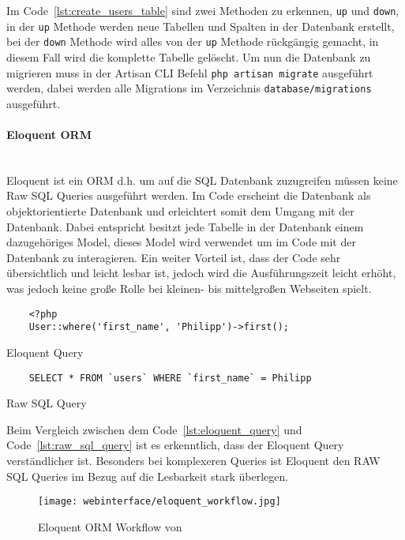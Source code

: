 Im Code~\ref{lst:create_users_table} sind zwei Methoden zu erkennen, \verb|up|
und \verb|down|, in der \verb|up| Methode werden neue Tabellen und Spalten in
der Datenbank erstellt, bei der \verb|down| Methode wird alles von der \verb|up|
Methode rückgängig gemacht, in diesem Fall wird die komplette Tabelle gelöscht.
Um nun die Datenbank zu migrieren muss in der Artisan \acs*{CLI} Befehl
\verb|php artisan migrate| ausgeführt werden, dabei werden alle Migrations im
Verzeichnis \verb|database/migrations| ausgeführt.

\paragraph{Eloquent ORM}\mbox{}\\
Eloquent ist ein \ac*{ORM} d.h. um auf die \acs*{SQL} Datenbank zuzugreifen
müssen keine Raw \acs*{SQL} Queries ausgeführt werden. Im Code erscheint die
Datenbank als objektorientierte Datenbank und erleichtert somit dem Umgang mit
der Datenbank. Dabei entspricht besitzt jede Tabelle in der Datenbank einem
dazugehöriges Model, dieses Model wird verwendet um im Code mit der Datenbank zu
interagieren. Ein weiter Vorteil ist, dass der Code sehr übersichtlich und
leicht lesbar ist, jedoch wird die Ausführungszeit leicht erhöht, was jedoch
keine große Rolle bei kleinen- bis mittelgroßen Webseiten spielt.

\begin{listing}[H]
  \begin{verbatim}
    <?php
    User::where('first_name', 'Philipp')->first();
  \end{verbatim}
  \caption{Eloquent Query}
  \label{lst:eloquent_query}
\end{listing}

\begin{listing}[H]
  \begin{verbatim}
    SELECT * FROM `users` WHERE `first_name` = Philipp
  \end{verbatim}
  \caption{Raw SQL Query}
  \label{lst:raw_sql_query}
\end{listing}

Beim Vergleich zwischen dem Code~\ref{lst:eloquent_query} und
Code~\ref{lst:raw_sql_query} ist es erkenntlich, dass der Eloquent Query
verständlicher ist. Besonders bei komplexeren Queries ist Eloquent den RAW
\acs*{SQL} Queries im Bezug auf die Lesbarkeit stark überlegen.

\begin{figure}[H]
  \centering
  \texttt{[image: webinterface/eloquent\_workflow.jpg]}
  \caption{Eloquent ORM Workflow von }
\end{figure}

